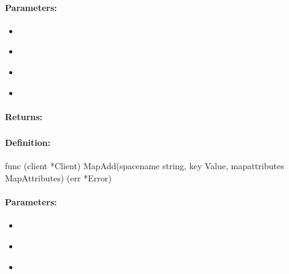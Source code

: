 \paragraph{Parameters:}
\begin{itemize}[noitemsep]
\item {}\\

\item {}\\

\item {}\\

\item {}\\

\end{itemize}

\paragraph{Returns:}


\pagebreak
\subsubsection{}
\label{api:Go:MapAdd}


\paragraph{Definition:}
\begin{gocode}
func (client *Client) MapAdd(spacename string, key Value, mapattributes MapAttributes) (err *Error)
\end{gocode}

\paragraph{Parameters:}
\begin{itemize}[noitemsep]
\item {}\\

\item {}\\

\item {}\\

\end{itemize}

